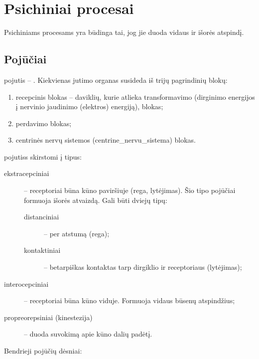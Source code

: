 \chapter{Psichiniai procesai}

\label{psichiniai_procesai}

Psichiniams procesams yra būdinga tai, jog jie duoda vidaus ir išorės
atspindį. %

\section{Pojūčiai}

\Gls{pojutis} – . Kiekvienas jutimo organas
susideda iš trijų pagrindinių blokų:

\begin{enumerate}
  \item recepcinis blokas – daviklių, kurie atlieka transformavimo 
    (dirginimo energijos į nervinio jaudinimo (elektros) energiją),
    blokas;
  \item perdavimo blokas;
  \item centrinės nervų sistemos (\gls{centrine_nervu_sistema}) blokas.
\end{enumerate}

\Glspl{pojutis} skirstomi į tipus: 


\begin{description}
  \item[ekstracepciniai] – receptoriai būna kūno paviršiuje (rega, 
    lytėjimas). Šio tipo pojūčiai formuoja išorės atvaizdą. Gali būti 
    dviejų tipų:
    \begin{description}
      \item[distanciniai] – per atstumą (rega);
      \item[kontaktiniai] – betarpiškas kontaktas tarp dirgiklio ir
        receptoriaus (lytėjimas);
    \end{description}
  \item[interocepciniai] – receptoriai būna kūno viduje. Formuoja vidaus 
    būsenų atspindžius;
  \item[propreorepsiniai (\gls{kinestezija})] – duoda suvokimą apie
    kūno dalių padėtį.
\end{description}

Bendrieji pojūčių dėsniai:

